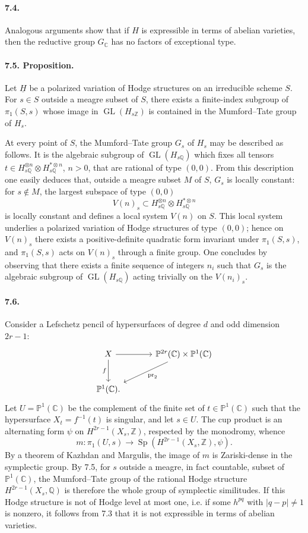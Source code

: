 \documentclass[10pt]{article}
\newcommand{\C}{\mathbb{C}}
\newcommand{\Q}{\mathbb{Q}}
\newcommand{\Z}{\mathbb{Z}}
\newcommand{\GL}{\operatorname{GL}}
\providecommand{\Sp}{\operatorname{Sp}}
\providecommand{\pr}{\operatorname{pr}}
\begin{document}
\paragraph{7.4.} Analogous arguments show that if $H$ is expressible in terms of abelian varieties, then the reductive group $G_\C$ has no factors of exceptional type.

\paragraph{7.5. Proposition.} Let $\underline H$ be a polarized variation of Hodge structures on an irreducible scheme $S$. For $s\in S$ outside a meagre subset of $S$, there exists a finite-index subgroup of $\pi_1(S,s)$ whose image in $\GL(H_{s\Z})$ is contained in the Mumford--Tate group of $H_s$.

At every point of $S$, the Mumford--Tate group $G_s$ of $H_s$ may be described as follows. It is the algebraic subgroup of $\GL(H_{s\Q})$ which fixes all tensors $t\in H_{s\Q}^{\otimes n}\otimes H_{s\Q}^{*\otimes n}$, $n>0$, that are rational of type $(0,0)$. From this description one easily deduces that, outside a meagre subset $M$ of $S$, $G_s$ is locally constant: for $s\notin M$, the largest subspace of type $(0,0)$
\[
V(n)_s\subset H_{s\Q}^{\otimes n}\otimes H_{s\Q}^{*\otimes n}
\]
is locally constant and defines a local system $V(n)$ on $S$. This local system underlies a polarized variation of Hodge structures of type $(0,0)$; hence on $V(n)_s$ there exists a positive-definite quadratic form invariant under $\pi_1(S,s)$, and $\pi_1(S,s)$ acts on $V(n)_s$ through a finite group. One concludes by observing that there exists a finite sequence of integers $n_i$ such that $G_s$ is the algebraic subgroup of $\GL(H_{s\Q})$ acting trivially on the $V(n_i)_s$.

\paragraph{7.6.} Consider a Lefschetz pencil of hypersurfaces of degree $d$ and odd dimension $2r-1$:
\[
\begin{tikzcd}[column sep=3.4em,row sep=2.4em]
X \arrow[r] \arrow[d,"f"'] & \mathbb P^{2r}(\C)\times\mathbb P^1(\C) \arrow[dl,"\pr_2"]\\
\mathbb P^1(\C).&
\end{tikzcd}
\]
Let $U=\mathbb P^1(\C)$ be the complement of the finite set of $t\in\mathbb P^1(\C)$ such that the hypersurface $X_t=f^{-1}(t)$ is singular, and let $s\in U$. The cup product is an alternating form $\psi$ on $H^{2r-1}(X_s,\Z)$, respected by the monodromy, whence
\[
m:\pi_1(U,s)\longrightarrow \Sp(H^{2r-1}(X_s,\Z),\psi).
\]
By a theorem of Kazhdan and Margulis, the image of $m$ is Zariski-dense in the symplectic group. By 7.5, for $s$ outside a meagre, in fact countable, subset of $\mathbb P^1(\C)$, the Mumford--Tate group of the rational Hodge structure $H^{2r-1}(X_s,\Q)$ is therefore the whole group of symplectic similitudes. If this Hodge structure is not of Hodge level at most one, i.e. if some $h^{pq}$ with $|q-p|\ne1$ is nonzero, it follows from 7.3 that it is not expressible in terms of abelian varieties.
\end{document}
